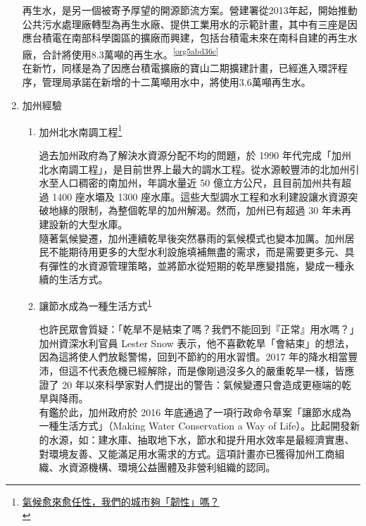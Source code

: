 \documentclass[a4paper,12pt]{article}
\begin{document}
\begin{enumerate}
再生水，是另一個被寄予厚望的開源節流方案。營建署從2013年起，開始推動公共污水處理廠轉型為再生水廠、提供工業用水的示範計畫，其中有三座是因應台積電在南部科學園區的擴廠而興建，包括台積電未來在南科自建的再生水廠，合計將使用8.3萬噸的再生水。\textsuperscript{\ref{org5abd36c}}\\

在新竹，同樣是為了因應台積電擴廠的寶山二期擴建計畫，已經進入環評程序，管理局承諾在新增的十二萬噸用水中，將使用3.6萬噸再生水。\\

\item 加州經驗
\label{sec:org58644e5}

\begin{enumerate}
\item 加州北水南調工程\footnote{\href{https://www.seinsights.asia/specialfeature/5065/5094}{氣候愈來愈任性，我們的城市夠「韌性」嗎？}\\\label{org350fab1}}
\label{sec:org7004bdb}

過去加州政府為了解決水資源分配不均的問題，於 1990 年代完成「加州北水南調工程」，是目前世界上最大的調水工程。從水源較豐沛的北加州引水至人口稠密的南加州，年調水量近 50 億立方公尺，且目前加州共有超過 1400 座水壩及 1300 座水庫。這些大型調水工程和水利建設讓水資源突破地緣的限制，為整個乾旱的加州解渴。然而，加州已有超過 30 年未再建設新的大型水庫。\\

隨著氣候變遷，加州連續乾旱後突然暴雨的氣候模式也變本加厲。加州居民不能期待用更多的大型水利設施填補無盡的需求，而是需要更多元、具有彈性的水資源管理策略，並將節水從短期的乾旱應變措施，變成一種永續的生活方式。\\

\item 讓節水成為一種生活方式\textsuperscript{\ref{org350fab1}}
\label{sec:org379ba74}

也許民眾會質疑：「乾旱不是結束了嗎？我們不能回到『正常』用水嗎？」加州資深水利官員 Lester Snow 表示，他不喜歡乾旱「會結束」的想法，因為這將使人們放鬆警惕，回到不節約的用水習慣。2017 年的降水相當豐沛，但這不代表危機已經解除，而是像剛過沒多久的嚴重乾旱一樣，皆應證了 20 年以來科學家對人們提出的警告：氣候變遷只會造成更極端的乾旱與降雨。\\

有鑑於此，加州政府於 2016 年底通過了一項行政命令草案「讓節水成為一種生活方式」（Making Water Conservation a Way of Life）。比起開發新的水源，如：建水庫、抽取地下水，節水和提升用水效率是最經濟實惠、對環境友善、又能滿足用水需求的方式。這項計畫亦已獲得加州工商組織、水資源機構、環境公益團體及非營利組織的認同。\\


\end{enumerate}
\end{enumerate}
\end{document}
